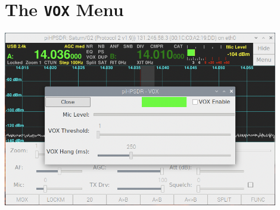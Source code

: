 \documentclass[12pt]{book}
\begin{document}
\section{The \texttt{VOX} Menu}
\begin{center}
\includegraphics[width=12cm]{VOXMenu.png}
\end{center}
\end{document}
